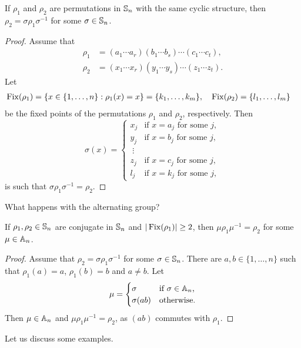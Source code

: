 \begin{lemma}
If $\rho_1$ and $\rho_2$ are permutations in $\mathbb{S}_n$ with the same
cyclic structure, then 
$\rho_2=\sigma\rho_1\sigma^{-1}$ for some
$\sigma\in\mathbb{S}_n$. 
\end{lemma}

\begin{proof}
Assume that 
\begin{align*}
\rho_1&=(a_1\cdots a_r)(b_1\cdots b_s)\cdots (c_1\cdots c_t),\\
\rho_2&=(x_1\cdots x_r)(y_1\cdots y_s)\cdots (z_1\cdots z_t).
\end{align*}
Let  
\begin{align*}
\operatorname{Fix}(\rho_1) &= \{x\in\{1,\dots,n\}:\rho_1(x)=x\}=\{k_1,\dots,k_m\},&&
\operatorname{Fix}(\rho_2)=\{l_1,\dots,l_m\}	
\end{align*}
be the fixed points of the permutations $\rho_1$ and $\rho_2$,
respectively. Then 
\[
\sigma(x)=\begin{cases}
x_j & \text{if $x=a_j$ for some $j$},\\
y_j & \text{if $x=b_j$ for some $j$},\\
\;\vdots\\
z_j & \text{if $x=c_j$ for some $j$},\\
l_j & \text{if $x=k_j$ for some $j$},	
\end{cases}
\]
is such that $\sigma\rho_1\sigma^{-1}=\rho_2$. 
\end{proof}

What happens with the alternating group? 

\begin{lemma}
If $\rho_1,\rho_2\in\mathbb{S}_n$ are conjugate in $\mathbb{S}_n$ and  $|\operatorname{Fix}(\rho_1)|\geq2$, then 
$\mu\rho_1\mu^{-1}=\rho_2$ for some $\mu\in\mathbb{A}_n$.  
\end{lemma}

\begin{proof}
Assume that $\rho_2=\sigma\rho_1\sigma^{-1}$ for some $\sigma\in\mathbb{S}_n$. 
There are $a,b\in\{1,\dots,n\}$ such that
$\rho_1(a)=a$, $\rho_1(b)=b$ and $a\ne b$. Let 
\[
\mu=\begin{cases}
\sigma & \text{if $\sigma\in\mathbb{A}_n$,}\\
\sigma(ab) & \text{otherwise.}
\end{cases}
\]
Then $\mu\in\mathbb{A}_n$ and $\mu\rho_1\mu^{-1}=\rho_2$, as 
$(ab)$ commutes with $\rho_1$. 
\end{proof}

Let us discuss some examples.

